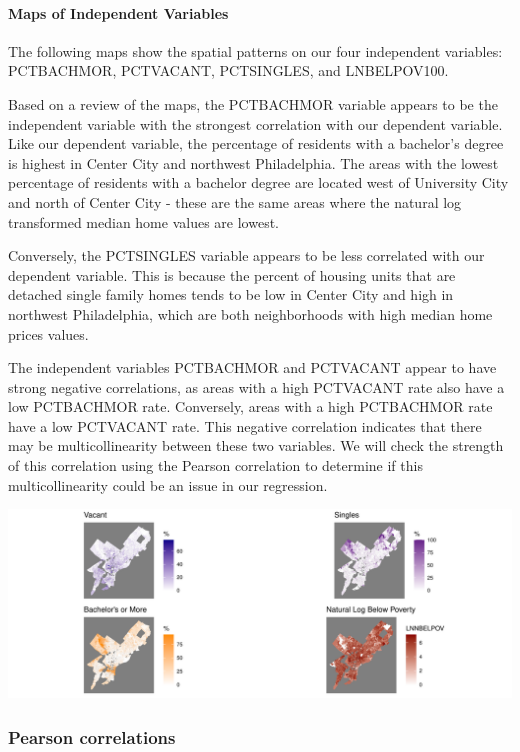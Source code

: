 \documentclass[
]{article}
\begin{document}
\hypertarget{maps-of-independent-variables}{%
\paragraph{Maps of Independent
Variables}\label{maps-of-independent-variables}}

The following maps show the spatial patterns on our four independent
variables: PCTBACHMOR, PCTVACANT, PCTSINGLES, and LNBELPOV100.

Based on a review of the maps, the PCTBACHMOR variable appears to be the
independent variable with the strongest correlation with our dependent
variable. Like our dependent variable, the percentage of residents with
a bachelor's degree is highest in Center City and northwest
Philadelphia. The areas with the lowest percentage of residents with a
bachelor degree are located west of University City and north of Center
City - these are the same areas where the natural log transformed median
home values are lowest.

Conversely, the PCTSINGLES variable appears to be less correlated with
our dependent variable. This is because the percent of housing units
that are detached single family homes tends to be low in Center City and
high in northwest Philadelphia, which are both neighborhoods with high
median home prices values.

The independent variables PCTBACHMOR and PCTVACANT appear to have strong
negative correlations, as areas with a high PCTVACANT rate also have a
low PCTBACHMOR rate. Conversely, areas with a high PCTBACHMOR rate have
a low PCTVACANT rate. This negative correlation indicates that there may
be multicollinearity between these two variables. We will check the
strength of this correlation using the Pearson correlation to determine
if this multicollinearity could be an issue in our regression.

\includegraphics{HW1-Regression_files/figure-latex/variables maps-1.pdf}

\hypertarget{pearson-correlations}{%
\subsubsection{Pearson correlations}\label{pearson-correlations}}
\end{document}
